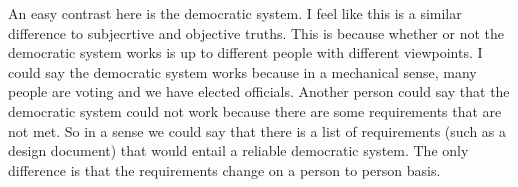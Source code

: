 \documentclass[12pt]{article}
\begin{document}
An easy contrast here is the democratic system. I feel like this is a similar difference to subjecrtive and objective truths. This is because whether or not the democratic system works is up to different people with different viewpoints. I could say the democratic system works because in a mechanical sense, many people are voting and we have elected officials. Another person could say that the democratic system could not work because there are some requirements that are not met. So in a sense we could say that there is a list of requirements (such as a design document) that would entail a reliable democratic system. The only difference is that the requirements change on a person to person basis. 
\end{document}
